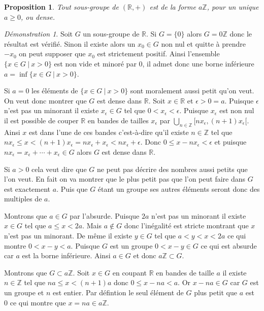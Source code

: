 \documentclass[a4paper, 11pt, french]{book}
\newenvironment{itemise}{\itemize}{\enditemize}
\theoremstyle{plain} %
\newtheorem{proposition}{Proposition}
\theoremstyle{definition} %
\theoremstyle{remark} %
\newtheorem*{demonstration}{Démonstration}
\newcommand{\1}{\mathds{1}}
\newcommand{\infegal}{\leqslant}
\newcommand{\supegal}{\geqslant}
\newcommand{\Z}{\mathbb{Z}}
\newcommand{\R}{\mathbb{R}}
\newcommand\ens[2]{\{#1 \ |\ #2\}}
\begin{document}
\begin{proposition}
	Tout sous-groupe de $(\R, +)$ est de la forme $a\Z$, pour un unique $a\supegal0$, ou dense.
\end{proposition}

\begin{demonstration}
	Soit $G$ un sous-groupe de $\R$.
	Si $G = \{ 0 \}$ alors $G = 0\Z$ donc le résultat est vérifié.
	Sinon il existe alors un $x_0\in G$ non nul et quitte à prendre $-x_0$ on peut supposer que $x_0$ est strictement positif.
	Ainsi l’ensemble $\ens{x\in G}{x > 0}$ est non vide et minoré par 0, il admet donc une borne inférieure $a=\inf\ens{x\in G}{x > 0}$.
	\begin{itemise}
		\item Si $a = 0$ les éléments de $\ens{x\in G}{x > 0}$ sont moralement aussi petit qu'on veut.
		On veut donc montrer que $G$ est dense dans $\R$.
		Soit $x\in\R$ et $\epsilon > 0 = a$.
		Puisque $\epsilon$ n'est pas un minorant il existe $x_\epsilon\in G$ tel que $0 < x_\epsilon < \epsilon$.
		Puisque $x_\epsilon$ est non nul il est possible de couper $\R$ en bandes de tailles $x_\epsilon$ par $\bigcup_{n\in\Z}[nx_\epsilon, (n+1)x_\epsilon[$.
		Ainsi $x$ est dans l'une de ces bandes c'est-à-dire qu'il existe $n\in\Z$ tel que $nx_\epsilon\infegal x < (n + 1)x_\epsilon=nx_\epsilon + x_\epsilon < nx_\epsilon + \epsilon$.
		Donc $0\infegal x - nx_\epsilon < \epsilon$ et puisque $nx_\epsilon = x_\epsilon + \cdots + x_\epsilon\in G$ alors $G$ est dense dans $\R$.
		\item Si $a>0$ cela veut dire que $G$ ne peut pas décrire des nombres aussi petits que l'on veut.
		En fait on va montrer que le plus petit pas que l'on peut faire dans $G$ est exactement $a$.
		Puis que $G$ étant un groupe ses autres éléments seront donc des multiples de $a$.
		\begin{itemise}
			\item Montrons que $a\in G$ par l'absurde.
			Puisque $2a$ n'est pas un minorant il existe $x\in G$ tel que $a \infegal x < 2a$.
			Mais $a\notin G$ donc l'inégalité est stricte montrant que $x$ n'est pas un minorant.
			De même il existe $y\in G$ tel que $a < y < x < 2a$ ce qui montre $0 < x - y < a$.
			Puisque $G$ est un groupe $0 < x - y\in G$ ce qui est absurde car $a$ est la borne inférieure.
			Ainsi $a\in G$ et donc $a\Z\subset G$.
			\item Montrons que $G\subset a\Z$.
			Soit $x\in G$ en coupant $\R$ en bandes de taille $a$ il existe $n\in\Z$ tel que $na\infegal x<(n+1)a$ donc $0\infegal x - na < a$.
			Or $x - na\in G$ car $G$ est un groupe et $n$ est entier.
			Par défintion le seul élément de $G$ plus petit que $a$ est $0$ ce qui montre que $x=na\in a\Z$.
		\end{itemise}
	\end{itemise}
\end{demonstration}
\end{document}
